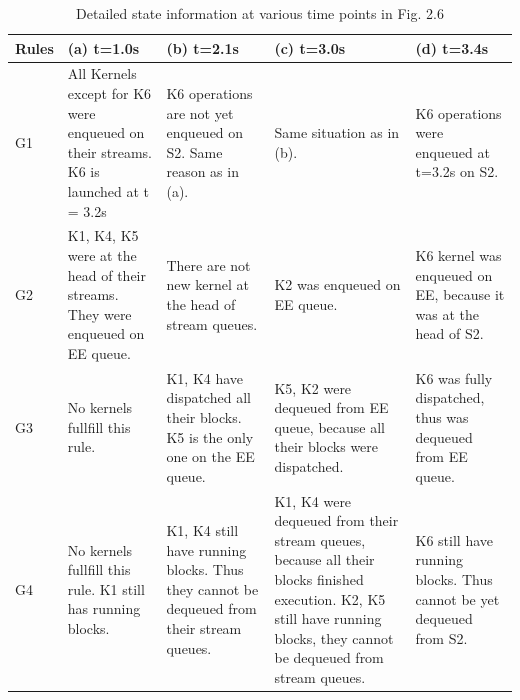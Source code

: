 \documentclass[
  12pt,
  a4paperpaper,
]{report}
\begin{document}
\begin{table}[hbtp]
\small
\begin{tabularx}{\linewidth}{|X|X|X|X|X|}
    \hline
Rules & (a) t=1.0s & (b) t=2.1s & (c) t=3.0s & (d) t=3.4s \\ \hline
G1 & All Kernels except for K6 were enqueued on their streams. K6 is launched at t = 3.2s & K6 operations are not yet enqueued on  S2. Same reason as in (a). & Same situation as in (b). & K6 operations were enqueued at t=3.2s on S2. \\ \hline
G2 & K1, K4, K5 were at the head of their streams. They were enqueued on EE queue. & There are not new kernel at the head of stream queues. & K2 was enqueued on EE queue. & K6 kernel was enqueued on EE, because it was at the head of S2. \\ \hline
G3 & No kernels fullfill this rule. & K1, K4 have dispatched all their blocks. K5 is the only one on the EE queue. & K5, K2 were dequeued from EE queue, because all their blocks were dispatched.  & K6 was fully dispatched, thus was dequeued from EE queue. \\ \hline
G4 & No kernels fullfill this rule. K1 still has running blocks. & K1, K4 still have running blocks. Thus they cannot be dequeued from their stream queues. & K1, K4 were dequeued from their stream queues, because all their blocks finished execution. K2, K5 still have running blocks, they cannot be dequeued from stream queues. & K6 still have running blocks. Thus cannot be yet dequeued from S2. \\ \hline
\end{tabularx}
\label{tab:scheduler_rules1}
\caption{Detailed state information at various time points in Fig. 2.6}
\end{table}
\end{document}
